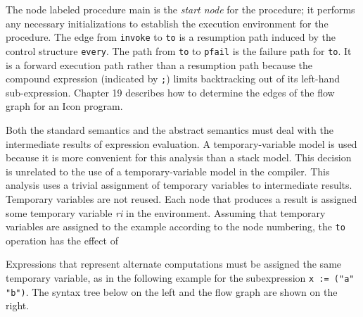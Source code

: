 The node labeled procedure main is the \textit{start node} for the
procedure; it performs any necessary initializations to establish the
execution environment for the procedure. The edge from \texttt{invoke}
to \texttt{to} is a resumption path induced by the control structure
\texttt{every}. The path from \texttt{to} to \texttt{pfail} is the
failure path for \texttt{to}. It is a forward execution path rather
than a resumption path because the compound expression (indicated by
\texttt{;}) limits backtracking out of its left-hand sub-expression.
Chapter 19 describes how to determine the edges of the flow graph for
an Icon program.

Both the standard semantics and the abstract semantics must deal with
the intermediate results of expression evaluation.  A
temporary-variable model is used because it is more convenient for
this analysis than a stack model. This decision is unrelated to the
use of a temporary-variable model in the compiler. This analysis uses
a trivial assignment of temporary variables to intermediate
results. Temporary variables are not reused. Each node that produces a
result is assigned some temporary variable \textit{ri} in the
environment. Assuming that temporary variables are assigned to the
example according to the node numbering, the \texttt{to} operation has
the effect of


\noindent
Expressions that represent alternate computations must be assigned the
same temporary variable, as in the following example for the
subexpression \texttt{x := ("a" {\textbar} "b")}. The syntax tree
below on the left and the flow graph are shown on the right.


